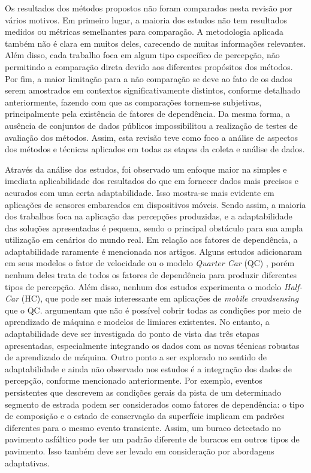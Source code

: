 Os resultados dos métodos propostos não foram comparados nesta revisão por vários motivos. Em primeiro lugar, a maioria dos estudos não tem resultados medidos ou métricas semelhantes para comparação. A metodologia aplicada também não é clara em muitos deles, carecendo de muitas informações relevantes. Além disso, cada trabalho foca em algum tipo específico de percepção, não permitindo a comparação direta devido aos diferentes propósitos dos métodos. Por fim, a maior limitação para a não comparação se deve ao fato de os dados serem amostrados em contextos significativamente distintos, conforme detalhado anteriormente, fazendo com que as comparações tornem-se subjetivas, principalmente pela existência de fatores de dependência. Da mesma forma, a ausência de conjuntos de dados públicos impossibilitou a realização de testes de avaliação dos métodos. Assim, esta revisão teve como foco a análise de aspectos dos métodos e técnicas aplicados em todas as etapas da coleta e análise de dados.

Através da análise dos estudos, foi observado um enfoque maior na simples e imediata aplicabilidade dos resultados do que em fornecer dados mais precisos e acurados com uma certa adaptabilidade. Isso mostra-se mais evidente em aplicações de sensores embarcados em dispositivos móveis. Sendo assim, a maioria dos trabalhos foca na aplicação das percepções produzidas, e a adaptabilidade das soluções apresentadas é pequena, sendo o principal obstáculo para sua ampla utilização em cenários do mundo real. Em relação aos fatores de dependência, a adaptabilidade raramente é mencionada nos artigos. Alguns estudos adicionaram em seus modelos o fator de velocidade ou o modelo \textit{Quarter Car} (QC) \cite{Tomiyama2016}, porém nenhum deles trata de todos os fatores de dependência para produzir diferentes tipos de percepção. Além disso, nenhum dos estudos experimenta o modelo \textit{Half-Car} (HC), que pode ser mais interessante em aplicações de \textit{mobile crowdsensing} que o QC.  argumentam que não é possível cobrir todas as condições por meio de aprendizado de máquina e modelos de limiares existentes. No entanto, a adaptabilidade deve ser investigada do ponto de vista das três etapas apresentadas, especialmente integrando os dados com as novas técnicas robustas de aprendizado de máquina. Outro ponto a ser explorado no sentido de adaptabilidade e ainda não observado nos estudos é a integração dos dados de percepção, conforme mencionado anteriormente. Por exemplo, eventos persistentes que descrevem as condições gerais da pista de um determinado segmento de estrada podem ser considerados como fatores de dependência: o tipo de composição e o estado de conservação da superfície implicam em padrões diferentes para o mesmo evento transiente. Assim, um buraco detectado no pavimento asfáltico pode ter um padrão diferente de buracos em outros tipos de pavimento. Isso também deve ser levado em consideração por abordagens adaptativas.
 
